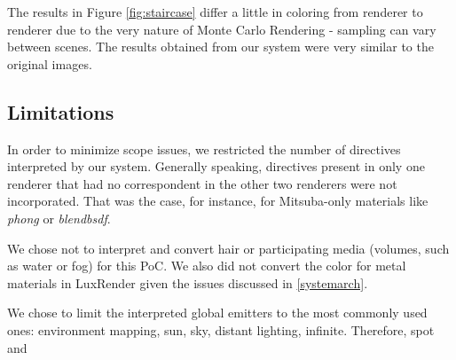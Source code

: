 The results in Figure \ref{fig:staircase} differ a little in coloring from 
renderer to renderer due to the very nature of Monte Carlo Rendering - sampling 
can vary between scenes. The results obtained from our system were very similar 
to the original images.




\subsection{Limitations}
In order to minimize scope issues, we restricted the number of directives 
interpreted by our system. Generally speaking, directives present in only one 
renderer that had no correspondent in the other two renderers were not 
incorporated. That was the case, for instance, for Mitsuba-only materials like 
\textit{phong} or \textit{blendbsdf}. 

We chose not to interpret and convert hair or participating media (volumes, such 
as water or fog) for this PoC. We also did not convert the color for metal 
materials in LuxRender given the issues discussed in \ref{systemarch}.

We chose to limit the interpreted global emitters to the most commonly used 
ones: environment mapping, sun, sky, distant lighting, infinite. Therefore, spot 
and 



